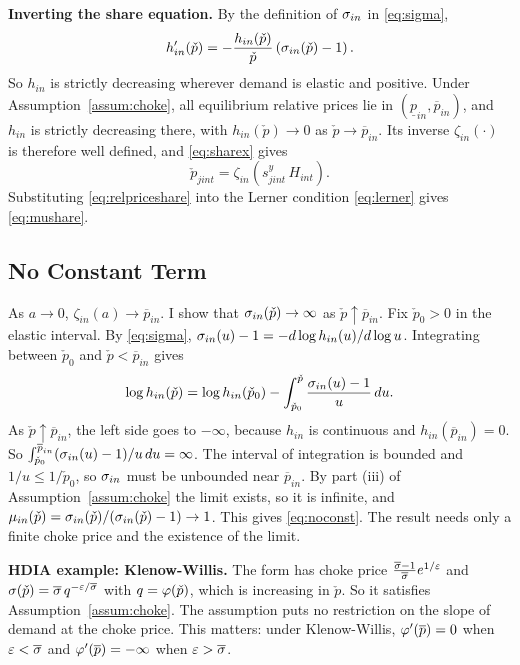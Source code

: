 \textbf{Inverting the share equation.}
By the definition of $\sigma_{in}$ in \eqref{eq:sigma},
\begin{equation*}
	h_{in}'(\check{p}) = -\frac{h_{in}(\check{p})}{\check{p}} \left(\sigma_{in}(\check{p}) - 1\right).
\end{equation*}
So $h_{in}$ is strictly decreasing wherever demand is elastic and positive.
Under Assumption~\ref{assum:choke}, all equilibrium relative prices lie in $(\underline{p}_{in}, \overline{p}_{in})$, and $h_{in}$ is strictly decreasing there, with $h_{in}(\check{p}) \to 0$ as $\check{p} \to \overline{p}_{in}$.
Its inverse $\zeta_{in}(\cdot)$ is therefore well defined, and \eqref{eq:sharex} gives
\begin{equation}\label{eq:relpriceshare}
	\check{p}_{jint} = \zeta_{in}\left(s^y_{jint} \, H_{int}\right).
\end{equation}
Substituting \eqref{eq:relpriceshare} into the Lerner condition \eqref{eq:lerner} gives \eqref{eq:mushare}.

\subsection{No Constant Term}\label{sec:app-noconst}

As $a \to 0$, $\zeta_{in}(a) \to \overline{p}_{in}$.
I show that $\sigma_{in}(\check{p}) \to \infty$ as $\check{p} \uparrow \overline{p}_{in}$.
Fix $\check{p}_0 > 0$ in the elastic interval.
By \eqref{eq:sigma}, $\sigma_{in}(u) - 1 = -d\log h_{in}(u)/d\log u$.
Integrating between $\check{p}_0$ and $\check{p} < \overline{p}_{in}$ gives
\begin{equation*}
	\log h_{in}(\check{p}) = \log h_{in}(\check{p}_0) - \int_{\check{p}_0}^{\check{p}} \frac{\sigma_{in}(u) - 1}{u} \, du.
\end{equation*}
As $\check{p} \uparrow \overline{p}_{in}$, the left side goes to $-\infty$, because $h_{in}$ is continuous and $h_{in}(\overline{p}_{in}) = 0$.
So $\int_{\check{p}_0}^{\overline{p}_{in}} (\sigma_{in}(u)-1)/u \, du = \infty$.
The interval of integration is bounded and $1/u \leq 1/\check{p}_0$, so $\sigma_{in}$ must be unbounded near $\overline{p}_{in}$.
By part (iii) of Assumption~\ref{assum:choke} the limit exists, so it is infinite, and $\mu_{in}(\check{p}) = \sigma_{in}(\check{p})/(\sigma_{in}(\check{p})-1) \to 1$.
This gives \eqref{eq:noconst}.
The result needs only a finite choke price and the existence of the limit.

\textbf{HDIA example: Klenow-Willis.}
The \textcite{Klenow&Willis16} form has choke price $\frac{\overline{\sigma}-1}{\overline{\sigma}} e^{1/\varepsilon}$ and $\sigma(\check{p}) = \overline{\sigma} \, q^{-\varepsilon/\overline{\sigma}}$ with $q = \varphi(\check{p})$, which is increasing in $\check{p}$.
So it satisfies Assumption~\ref{assum:choke}.
The assumption puts no restriction on the slope of demand at the choke price.
This matters: under Klenow-Willis, $\varphi'(\overline{p}) = 0$ when $\varepsilon < \overline{\sigma}$ and $\varphi'(\overline{p}) = -\infty$ when $\varepsilon > \overline{\sigma}$.

